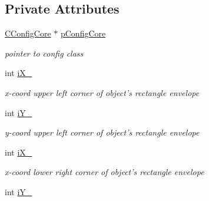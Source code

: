 \subsection*{Private Attributes}
\begin{DoxyCompactItemize}
\item 
\hypertarget{classCFitness_a310d2b868145aabcf214aae88461d13b}{
\hyperlink{classCConfigCore}{CConfigCore} $\ast$ \hyperlink{classCFitness_a310d2b868145aabcf214aae88461d13b}{pConfigCore}}
\label{classCFitness_a310d2b868145aabcf214aae88461d13b}

\begin{DoxyCompactList}\small\item\em pointer to config class \item\end{DoxyCompactList}\item 
\hypertarget{classCFitness_aaae8574bcd7930f2e5d327ba82652f18}{
int \hyperlink{classCFitness_aaae8574bcd7930f2e5d327ba82652f18}{iX\_}}
\label{classCFitness_aaae8574bcd7930f2e5d327ba82652f18}

\begin{DoxyCompactList}\small\item\em x-\/coord upper left corner of object's rectangle envelope \item\end{DoxyCompactList}\item 
\hypertarget{classCFitness_a5d6782a2960931a4ee7533bc972ad598}{
int \hyperlink{classCFitness_a5d6782a2960931a4ee7533bc972ad598}{iY\_}}
\label{classCFitness_a5d6782a2960931a4ee7533bc972ad598}

\begin{DoxyCompactList}\small\item\em y-\/coord upper left corner of object's rectangle envelope \item\end{DoxyCompactList}\item 
\hypertarget{classCFitness_a5ceb3a8ede00cd90aa53094a28f354d2}{
int \hyperlink{classCFitness_a5ceb3a8ede00cd90aa53094a28f354d2}{iX\_}}
\label{classCFitness_a5ceb3a8ede00cd90aa53094a28f354d2}

\begin{DoxyCompactList}\small\item\em x-\/coord lower right corner of object's rectangle envelope \item\end{DoxyCompactList}\item 
\hypertarget{classCFitness_a7f616a3a284b09be4de131eb11ab6916}{
int \hyperlink{classCFitness_a7f616a3a284b09be4de131eb11ab6916}{iY\_}}
\label{classCFitness_a7f616a3a284b09be4de131eb11ab6916}


\end{DoxyCompactItemize}
